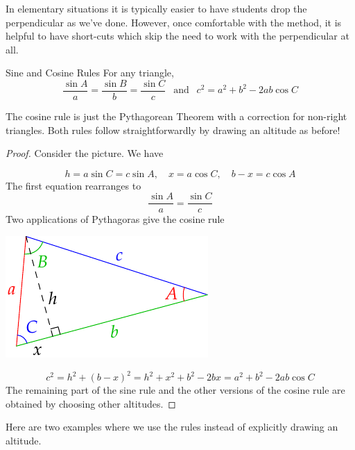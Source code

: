 In elementary situations it is typically easier to have students drop the perpendicular as we've done. However, once comfortable with the method, it is helpful to have short-cuts which skip the need to work with the perpendicular at all.


\begin{thm}{Sine and Cosine Rules}{}
	For any triangle,
	\[
		\frac{\sin A}a=\frac{\sin B}b=\frac{\sin C}c\ \ \text{ and }\ \ c^2=a^2+b^2-2ab\cos C
	\]
\end{thm}

The cosine rule is just the Pythagorean Theorem with a correction for non-right triangles. Both rules follow straightforwardly by drawing an altitude as before!

\begin{proof}
	Consider the picture. We have\par
	\begin{minipage}[t]{0.6\linewidth}\vspace{-11pt}
		\[
			h=a\sin C=c\sin A,\quad x=a\cos C,\quad b-x=c\cos A
		\]
		The first equation rearranges to
		\[
			\frac{\sin A}a=\frac{\sin C}c
		\]
		Two applications of Pythagoras give the cosine rule
	\end{minipage}
	\hfill
	\begin{minipage}[t]{0.39\linewidth}\vspace{-5pt}
		\flushright\includegraphics{sinerule}
	\end{minipage}\smallbreak
	\[
		c^2=h^2+(b-x)^2=h^2+x^2+b^2-2bx =a^2+b^2-2ab\cos C
	\]
	The remaining part of the sine rule and the other versions of the cosine rule are obtained by choosing other altitudes.
\end{proof}


Here are two examples where we use the rules instead of explicitly drawing an altitude.

